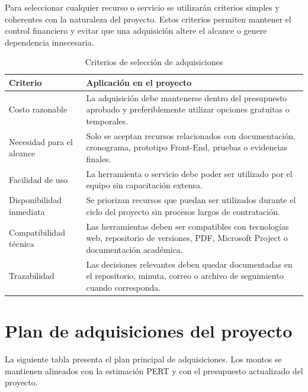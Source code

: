 \documentclass[11pt,spanish]{article}
\begin{document}
Para seleccionar cualquier recurso o servicio se utilizarán criterios simples y coherentes con la naturaleza del proyecto. Estos criterios permiten mantener el control financiero y evitar que una adquisición altere el alcance o genere dependencia innecesaria.

\begin{table}[H]
\centering
\caption{Criterios de selección de adquisiciones}
\label{tab:criterios-adquisiciones}
{\small
\begin{tabularx}{\textwidth}{p{4cm} Y}
\toprule
\textbf{Criterio} & \textbf{Aplicación en el proyecto} \\
\midrule
Costo razonable & La adquisición debe mantenerse dentro del presupuesto aprobado y preferiblemente utilizar opciones gratuitas o temporales. \\
Necesidad para el alcance & Solo se aceptan recursos relacionados con documentación, cronograma, prototipo Front-End, pruebas o evidencias finales. \\
Facilidad de uso & La herramienta o servicio debe poder ser utilizado por el equipo sin capacitación extensa. \\
Disponibilidad inmediata & Se priorizan recursos que puedan ser utilizados durante el ciclo del proyecto sin procesos largos de contratación. \\
Compatibilidad técnica & Las herramientas deben ser compatibles con tecnologías web, repositorio de versiones, PDF, Microsoft Project o documentación académica. \\
Trazabilidad & Las decisiones relevantes deben quedar documentadas en el repositorio, minuta, correo o archivo de seguimiento cuando corresponda. \\
\bottomrule
\end{tabularx}
}
\end{table}

\section{Plan de adquisiciones del proyecto}

La siguiente tabla presenta el plan principal de adquisiciones. Los montos se mantienen alineados con la estimación PERT y con el presupuesto actualizado del proyecto.
\end{document}
